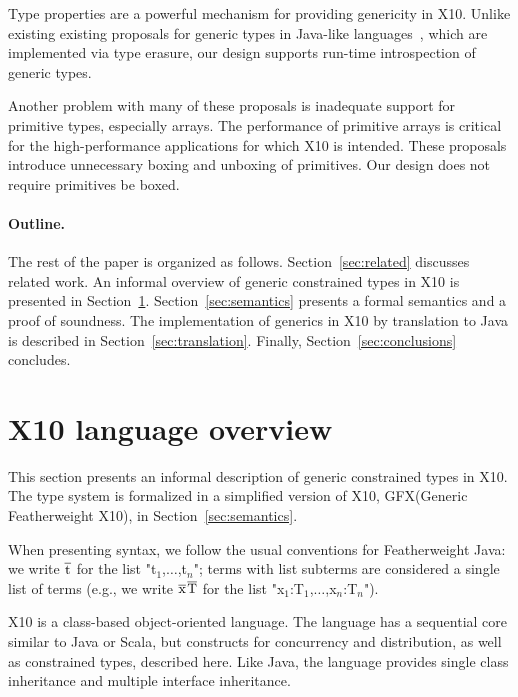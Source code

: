 \documentclass[preprint,nocopyrightspace,9pt]{sigplanconf}
\newcommand\gxx{GFX\xspace}
\newcommand\xbar[1]{\ensuremath{\bar{\Xcd{#1}}}}
\begin{document}
Type properties are a powerful mechanism
for providing genericity in X10.
Unlike existing 
existing proposals for generic types in
Java-like
languages~\cite{Java3,GJ,Pizza,polyj,thorup97,scala},
which 
are implemented via type erasure,
our design supports run-time introspection of generic types.

Another problem with many of these proposals is inadequate support
for primitive types, especially arrays. The performance of primitive arrays is
critical for the high-performance applications for which
X10 is intended. These proposals introduce unnecessary boxing
and unboxing of primitives.
Our design does not require primitives be boxed.

\paragraph{Outline.}
The rest of the paper is organized as follows.
%
Section~\ref{sec:related} discusses related work.
%
An informal overview of generic constrained types in X10
is presented in
Section~\ref{sec:lang}.  
%
Section~\ref{sec:semantics} presents a formal semantics and a
proof of soundness.
%
The implementation of generics in X10 by translation to Java is described in 
Section~\ref{sec:translation}.
%
Finally, Section~\ref{sec:conclusions} concludes.


\section{X10 language overview}
\label{sec:lang}

This section presents an informal description of 
generic constrained types in X10.  The type system is formalized
in a simplified version of X10, \gxx (Generic Featherweight X10), in
Section~\ref{sec:semantics}.

When presenting syntax, we follow the usual conventions for
Featherweight Java:
we write \xbar{t} for the list
\xcdmath"t$_1$,$\dots$,t$_n$"; 
terms with list subterms are considered 
a single list of terms (e.g., 
we write \xbar{x}\Xcd{:}\xbar{T} for the list
\xcdmath"x$_1$:T$_1$,$\dots$,x$_n$:T$_n$").

X10 is a class-based object-oriented language.
The language has a sequential core similar to Java or Scala, but 
constructs
for concurrency and distribution, as well as constrained types,
described here.
Like Java, the language provides single class inheritance and
multiple interface inheritance.
\end{document}
